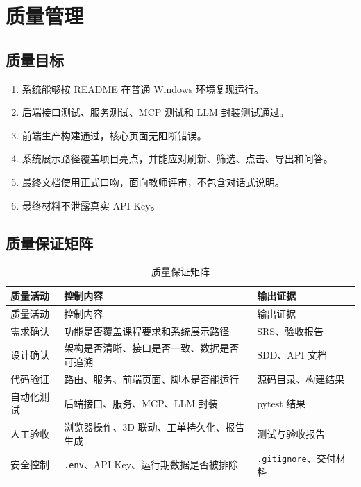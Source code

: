 \documentclass[12pt,a4paper]{ctexart}
\newcommand{\code}[1]{{\footnotesize\nolinkurl{#1}}}
\begin{document}
\section{质量管理}
\subsection{质量目标}
\begin{enumerate}
    \item 系统能够按 README 在普通 Windows 环境复现运行。
    \item 后端接口测试、服务测试、MCP 测试和 LLM 封装测试通过。
    \item 前端生产构建通过，核心页面无阻断错误。
    \item 系统展示路径覆盖项目亮点，并能应对刷新、筛选、点击、导出和问答。
    \item 最终文档使用正式口吻，面向教师评审，不包含对话式说明。
    \item 最终材料不泄露真实 API Key。
\end{enumerate}

\subsection{质量保证矩阵}
\begin{longtable}{p{3.2cm}p{4.8cm}p{5.5cm}}
\caption{质量保证矩阵}\\
\toprule
质量活动 & 控制内容 & 输出证据 \\
\midrule
\endfirsthead
\toprule
质量活动 & 控制内容 & 输出证据 \\
\midrule
\endhead
需求确认 & 功能是否覆盖课程要求和系统展示路径 & SRS、验收报告 \\
设计确认 & 架构是否清晰、接口是否一致、数据是否可追溯 & SDD、API 文档 \\
代码验证 & 路由、服务、前端页面、脚本是否能运行 & 源码目录、构建结果 \\
自动化测试 & 后端接口、服务、MCP、LLM 封装 & pytest 结果 \\
人工验收 & 浏览器操作、3D 联动、工单持久化、报告生成 & 测试与验收报告 \\
安全控制 & \code{.env}、API Key、运行期数据是否被排除 & \code{.gitignore}、交付材料 \\
\bottomrule
\end{longtable}
\end{document}
